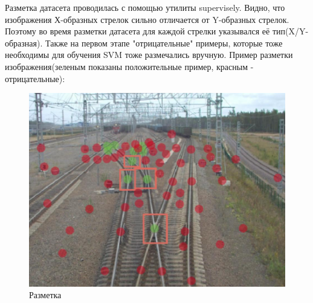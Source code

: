 \newpage
Разметка датасета проводилась с помощью утилиты supervisely.
Видно, что изображения Х-образных стрелок сильно отличается от Y-образных стрелок. Поэтому во время разметки датасета для каждой стрелки указывался её тип(X/Y-образная). Также на первом этапе "отрицательные" примеры, которые тоже необходимы для обучения SVM тоже размечались вручную. Пример разметки изображения(зеленым показаны положительные пример, красным - отрицательные):
\begin{figure}[h!]
	\centering
	\includegraphics[width=1\linewidth]{pictures/screenshot2}
	\caption{Разметка}
	\label{fig:screenshot2}
\end{figure}

